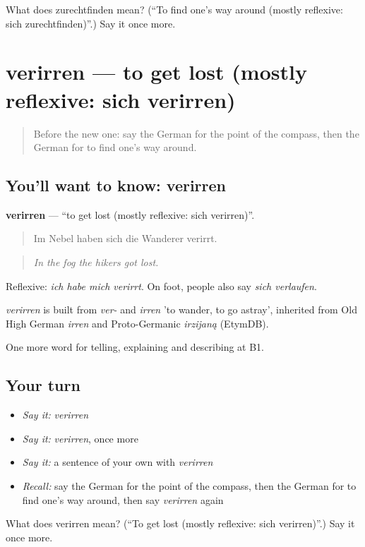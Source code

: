 \begin{tcolorbox}[breakable,colback=teal!4,colframe=teal!35!black,title={Before you move on}]
What does zurechtfinden mean? (\textquotedblleft{}To find one's way around (mostly reflexive: sich zurechtfinden)\textquotedblright{}.) Say it once more.
\end{tcolorbox}
\section[verirren]{verirren — to get lost (mostly reflexive: sich verirren)}

\label{lesson:GE-C433-verirren}



\begin{quote}
Before the new one: say the German for the point of the compass, then the German for to find one's way around.
\end{quote}

\subsection*{You'll want to know: verirren}
\textbf{verirren} — \textquotedblleft{}to get lost (mostly reflexive: sich verirren)\textquotedblright{}.

\begin{quote}
Im Nebel haben sich die Wanderer verirrt.
\end{quote}

\begin{quote}
\emph{In the fog the hikers got lost.}
\end{quote}

Reflexive: \emph{ich habe mich verirrt}. On foot, people also say \emph{sich verlaufen}.

\begin{cousinweb}
\emph{verirren} is built from \emph{ver-} and \emph{irren} 'to wander, to go astray', inherited from Old High German \emph{irren} and Proto-Germanic \emph{irzijaną} (EtymDB).
\end{cousinweb}

\begin{grammarlens}[title={What you've built}]
One more word for telling, explaining and describing at B1.
\end{grammarlens}

\subsection*{Your turn}
\begin{itemize}
\raggedright
  \item \emph{Say it:} \emph{verirren}
  \item \emph{Say it:} \emph{verirren}, once more
  \item \emph{Say it:} a sentence of your own with \emph{verirren}
  \item \emph{Recall:} say the German for the point of the compass, then the German for to find one's way around, then say \emph{verirren} again
\end{itemize}

\begin{tcolorbox}[breakable,colback=teal!4,colframe=teal!35!black,title={Before you move on}]
What does verirren mean? (\textquotedblleft{}To get lost (mostly reflexive: sich verirren)\textquotedblright{}.) Say it once more.
\end{tcolorbox}
